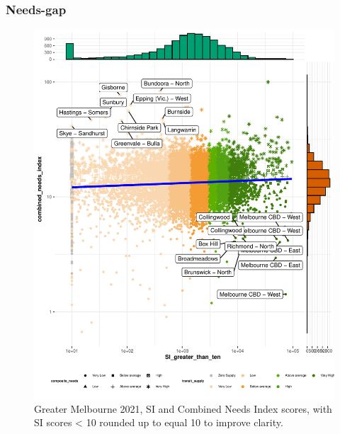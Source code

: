 \documentclass[preprint, 3p,
authoryear]{elsarticle} %
\begin{document}
\subsubsection{Needs-gap}\label{needs-gap}

\begin{figure}
\centering
\includegraphics{ReynoldsCurrieQu2024_files/figure-latex/Greater_Melbourne_2021_needs_gap_scatterplot_figure-1.pdf}
\caption{Greater Melbourne 2021, SI and Combined Needs Index scores,
with SI scores \textless{} 10 rounded up to equal 10 to improve
clarity.}
\end{figure}
\end{document}
